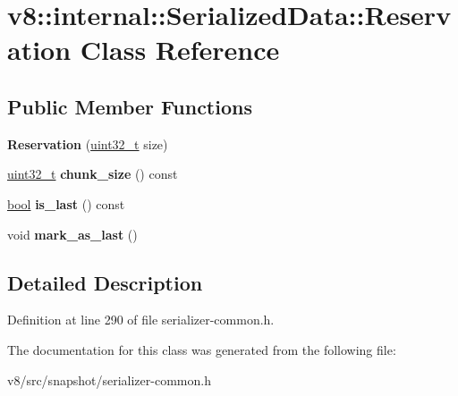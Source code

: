 \hypertarget{classv8_1_1internal_1_1SerializedData_1_1Reservation}{}\section{v8\+:\+:internal\+:\+:Serialized\+Data\+:\+:Reservation Class Reference}
\label{classv8_1_1internal_1_1SerializedData_1_1Reservation}
\subsection*{Public Member Functions}
\begin{DoxyCompactItemize}
\item 
\mbox{\label{classv8_1_1internal_1_1SerializedData_1_1Reservation_a279ebec1e43ead301efff752242e8124}} 
{\bfseries Reservation} (\mbox{\hyperlink{classuint32__t}{uint32\+\_\+t}} size)
\item 
\mbox{\label{classv8_1_1internal_1_1SerializedData_1_1Reservation_ad347745c37da74e3a6d48f7a8adc73e1}} 
\mbox{\hyperlink{classuint32__t}{uint32\+\_\+t}} {\bfseries chunk\+\_\+size} () const
\item 
\mbox{\label{classv8_1_1internal_1_1SerializedData_1_1Reservation_a33e5354dc26026df4aa2bfc28cde5f19}} 
\mbox{\hyperlink{classbool}{bool}} {\bfseries is\+\_\+last} () const
\item 
\mbox{\label{classv8_1_1internal_1_1SerializedData_1_1Reservation_aa98e7d8e118ce2b8e4f5e2246b1bc8e0}} 
void {\bfseries mark\+\_\+as\+\_\+last} ()
\end{DoxyCompactItemize}


\subsection{Detailed Description}


Definition at line 290 of file serializer-\/common.\+h.



The documentation for this class was generated from the following file\+:\begin{DoxyCompactItemize}
\item 
v8/src/snapshot/serializer-\/common.\+h\end{DoxyCompactItemize}
